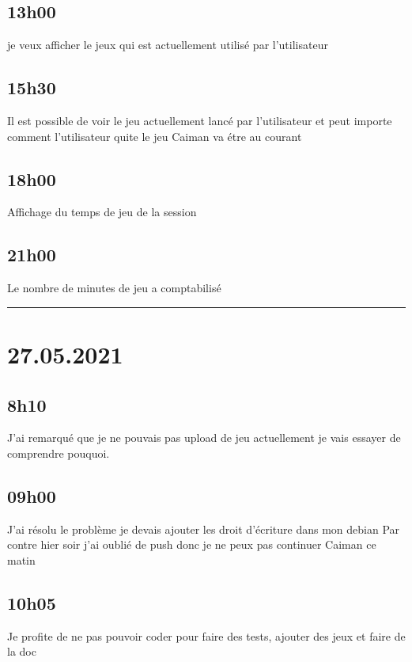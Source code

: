 \documentclass[a4paper,12pt,french]{sphinxmanual}
\begin{document}
\subsection{13h00}
\label{\detokenize{logbook:id159}}
\sphinxAtStartPar
je veux afficher le jeux qui est actuellement utilisé par l’utilisateur


\subsection{15h30}
\label{\detokenize{logbook:id160}}
\sphinxAtStartPar
Il est possible de voir le jeu actuellement lancé par l’utilisateur et peut importe comment l’utilisateur quite le jeu Caiman va étre au courant


\subsection{18h00}
\label{\detokenize{logbook:id161}}
\sphinxAtStartPar
Affichage du temps de jeu de la session


\subsection{21h00}
\label{\detokenize{logbook:id162}}
\sphinxAtStartPar
Le nombre de minutes de jeu a comptabilisé


\bigskip\hrule\bigskip



\section{27.05.2021}
\label{\detokenize{logbook:id163}}

\subsection{8h10}
\label{\detokenize{logbook:id164}}
\sphinxAtStartPar
J’ai remarqué que je ne pouvais pas upload de jeu actuellement je vais essayer de comprendre pouquoi.


\subsection{09h00}
\label{\detokenize{logbook:id165}}
\sphinxAtStartPar
J’ai résolu le problème je devais ajouter les droit d’écriture dans mon debian
Par contre hier soir j’ai oublié de push donc je ne peux pas continuer Caiman ce matin


\subsection{10h05}
\label{\detokenize{logbook:id166}}
\sphinxAtStartPar
Je profite de ne pas pouvoir coder pour faire des tests, ajouter des jeux et faire de la doc
\end{document}

